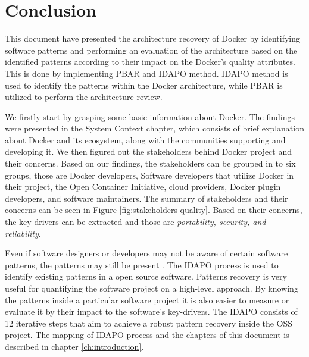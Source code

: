 
\clearpage
\chapter{Conclusion}
\label{ch:conclusion}


This document have presented the architecture recovery of Docker by identifying
software patterns and performing an evaluation of the architecture based on the
identified patterns according to their impact on the Docker's quality
attributes. This is done by implementing PBAR and IDAPO method. IDAPO method is
used to identify the patterns within the Docker architecture, while PBAR is
utilized to perform the architecture review.

We firstly start by grasping some basic information about Docker. The findings
were presented in the System Context chapter, which consists of brief
explanation about Docker and its ecosystem, along with the communities
supporting and developing it. We then figured out the stakeholders behind Docker
project and their concerns. Based on our findings, the stakeholders can be
grouped in to six groups, those are Docker developers, Software developers that
utilize Docker in their project, the Open Container Initiative, cloud providers,
Docker plugin developers, and software maintainers. The summary of stakeholders
and their concerns can be seen in Figure \ref{fig:stakeholders-quality}. Based
on their concerns, the key-drivers can be extracted and those are
\textit{portability, security, and reliability}.

Even if software designers or developers may not be aware of certain software
patterns, the patterns may still be present \cite{idapo}. The IDAPO process is
used to identify existing patterns in a open source software. Patterns recovery
is very useful for quantifying the software project on a high-level approach. By
knowing the patterns inside a particular software project it is also easier to
measure or evaluate it by their impact to the software's key-drivers. The IDAPO
consists of 12 iterative steps that aim to achieve a robust pattern recovery
inside the OSS project. The mapping of IDAPO process and the chapters of this
document is described in chapter \ref{ch:introduction}.

